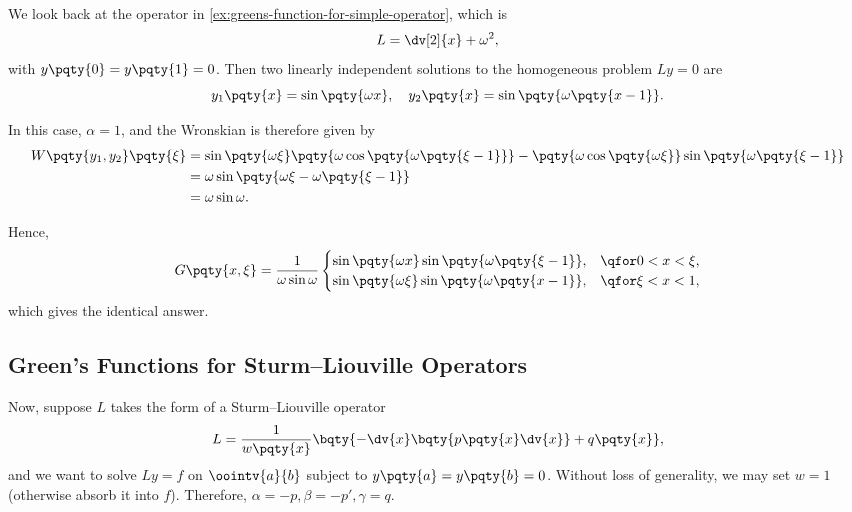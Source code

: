 \begin{example}
    We look back at the operator in \autoref{ex:greens-function-for-simple-operator}, which is
    \begin{equation}
        L = \dv[2]{x} + \omega^2,
    \end{equation}
    with \(y\pqty{0} = y\pqty{1} = 0\). Then two linearly independent solutions to the homogeneous problem \(Ly = 0\) are
    \begin{equation}
        y_1\pqty{x} = \sin\pqty{\omega x}, \quad y_2\pqty{x} = \sin\pqty{\omega \pqty{x - 1}}.
    \end{equation}

    In this case, \(\alpha = 1\), and the Wronskian is therefore given by
    \begin{subequations}
        \begin{align}
            W\pqty{y_1, y_2} \pqty{\xi} &= \sin\pqty{\omega \xi} \pqty{\omega \cos \pqty{\omega \pqty{\xi - 1}}} - \pqty{\omega \cos \pqty{\omega \xi}} \sin\pqty{\omega \pqty{\xi - 1}} \\
            &= \omega \sin \pqty{\omega \xi - \omega \pqty{\xi - 1}} \\
            &= \omega \sin \omega.
        \end{align}
    \end{subequations}

    Hence,
    \begin{equation}
        G\pqty{x, \xi} = \frac{1}{\omega \sin \omega} \begin{cases}
            \sin\pqty{\omega x} \sin\pqty{\omega \pqty{\xi - 1}}, & \qfor 0 < x < \xi, \\
            \sin\pqty{\omega \xi} \sin\pqty{\omega \pqty{x - 1}}, & \qfor \xi < x < 1,
        \end{cases}
    \end{equation}
    which gives the identical answer.
\end{example}

\subsection{Green's Functions for Sturm--Liouville Operators}

Now, suppose \(L\) takes the form of a Sturm--Liouville operator
\begin{equation}
    L = \frac{1}{w\pqty{x}} \bqty{- \dv{x} \bqty{p\pqty{x} \dv{x}} + q\pqty{x}},
\end{equation}
and we want to solve \(Ly = f\) on \(\oointv{a}{b}\) subject to \(y\pqty{a} = y\pqty{b} = 0\). Without loss of generality, we may set \(w = 1\) (otherwise absorb it into \(f\)). Therefore, \(\alpha = -p, \beta = - p', \gamma = q\).

